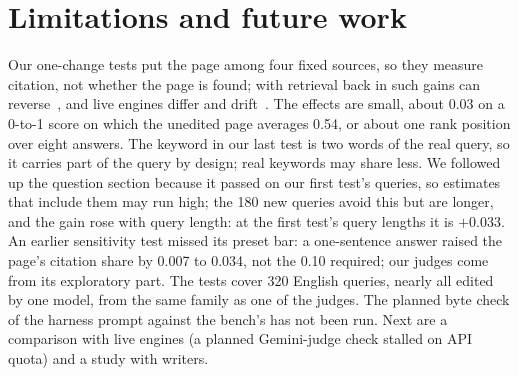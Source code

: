 \section{Limitations and future work}\label{sec:conclusion}
Our one-change tests put the page among four fixed sources, so they measure citation, not whether the page is found; with retrieval back in such gains can reverse~\cite{kim2026sageo}, and live engines differ and drift~\cite{martinez2026survey}.
The effects are small, about 0.03 on a 0-to-1 score on which the unedited page averages 0.54, or about one rank position over eight answers.
The keyword in our last test is two words of the real query, so it carries part of the query by design; real keywords may share less.
We followed up the question section because it passed on our first test's queries, so estimates that include them may run high; the 180 new queries avoid this but are longer, and the gain rose with query length: at the first test's query lengths it is $+0.033$.
An earlier sensitivity test missed its preset bar: a one-sentence answer raised the page's citation share by 0.007 to 0.034, not the 0.10 required; our judges come from its exploratory part.
The tests cover 320 English queries, nearly all edited by one model, from the same family as one of the judges.
The planned byte check of the harness prompt against the bench's has not been run.
Next are a comparison with live engines (a planned Gemini-judge check stalled on API quota) and a study with writers.

